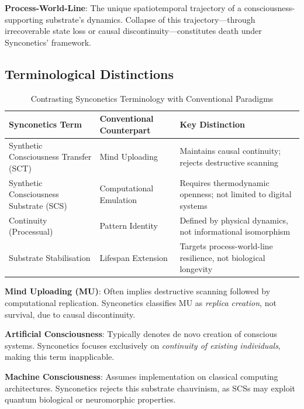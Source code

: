 \documentclass[10pt]{article}
\begin{document}
\begin{sloppypar}
  \textbf{Process-World-Line}: The unique spatiotemporal trajectory of a consciousness-supporting substrate’s dynamics. Collapse of this trajectory—through irrecoverable state loss or causal discontinuity—constitutes death under Synconetics’ framework.

  \subsection{Terminological Distinctions}
  \begin{table}[h]
    \centering
    \caption{Contrasting Synconetics Terminology with Conventional Paradigms}
    \begin{tabular}{p{}p{}p{}}
      \toprule
      \textbf{Synconetics Term}               & \textbf{Conventional Counterpart} & \textbf{Key Distinction}                                        \\
      \midrule
      Synthetic Consciousness Transfer (SCT)  & Mind Uploading                    & Maintains causal continuity; rejects destructive scanning       \\
      Synthetic Consciousness Substrate (SCS) & Computational Emulation           & Requires thermodynamic openness; not limited to digital systems \\
      Continuity (Processual)                 & Pattern Identity                  & Defined by physical dynamics, not informational isomorphism     \\
      Substrate Stabilisation                 & Lifespan Extension                & Targets process-world-line resilience, not biological longevity \\
      \bottomrule
    \end{tabular}
    \label{tab:terminology}
  \end{table}

  \textbf{Mind Uploading (MU)}: Often implies destructive scanning followed by computational replication. Synconetics classifies MU as \textit{replica creation}, not survival, due to causal discontinuity.

  \textbf{Artificial Consciousness}: Typically denotes de novo creation of conscious systems. Synconetics focuses exclusively on \textit{continuity of existing individuals}, making this term inapplicable.

  \textbf{Machine Consciousness}: Assumes implementation on classical computing architectures. Synconetics rejects this substrate chauvinism, as SCSs may exploit quantum biological or neuromorphic properties.


\end{sloppypar}
\end{document}
